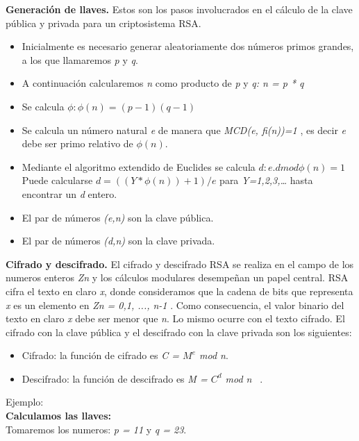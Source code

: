 \textbf{Generación de llaves.} Estos son los pasos involucrados en el cálculo de la clave pública y privada para un criptosistema
RSA. \\
\begin{itemize}
\item Inicialmente es necesario generar aleatoriamente dos números primos grandes, a los que llamaremos \textit{p} y \textit{q}.
\item A continuación calcularemos \textit{n} como producto de \textit{p} y \textit{q: n = p * q}
\item Se calcula \textit{$ \phi : \phi (n)=(p-1)(q-1)$}
\item Se calcula un número natural \textit{e} de manera que \textit{MCD(e, fi(n))=1} , es decir \textit{e} debe ser primo relativo de \textit{$\phi(n)$}.
\item Mediante el algoritmo extendido de Euclides se calcula \textit{$d: e.d mod \phi (n)=1$} Puede calcularse \textit{$d=((Y* \phi (n))+1)/e$} para \textit{Y=1,2,3,…} hasta encontrar un \textit{d} entero.
\item El par de números \textit{(e,n)} son la clave pública.
\item El par de números \textit{(d,n)} son la clave privada.
\end{itemize} 
\textbf{Cifrado y descifrado.} El cifrado y descifrado RSA se realiza en el campo de los numeros enteros \textit{Zn} y los cálculos modulares desempeñan un papel central. RSA cifra el texto en claro \textit{x}, donde consideramos que la cadena de bits que representa \textit{x} es un elemento en \textit{Zn = 0,1, ..., n-1} . Como consecuencia, el valor binario del texto en claro \textit{x} debe ser menor que \textit{n}. Lo mismo ocurre con el texto cifrado. El cifrado con la clave pública y el descifrado con la clave privada son los siguientes:

\begin{itemize}
\item Cifrado: la función de cifrado es \textit{C = $M^{e}$ mod n}.

\item Descifrado: la función de descifrado es \textit{M = $C^{d}$ mod n}  ~\cite{paar}.
\end{itemize} 

Ejemplo:\\

\textbf{Calculamos las llaves: }\\

Tomaremos los numeros:    \textit{p = 11} y \textit{q = 23}. \\ 

